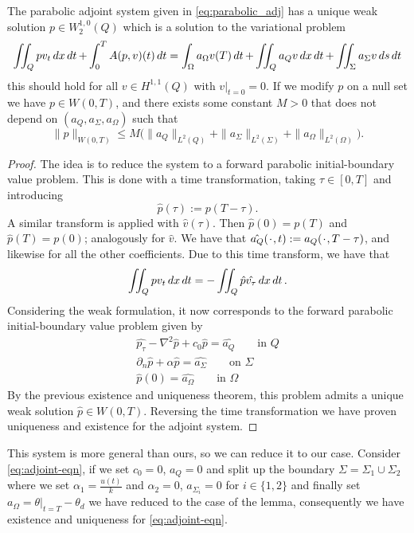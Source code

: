 \begin{lemma}
The parabolic adjoint system given in \eqref{eq:parabolic_adj} has a unique weak solution $p \in W_2^{1,0}(Q)$ which is a solution to the variational problem 
\begin{equation*}
    \iint_Q pv_t \mathop{dx}\mathop{dt} + \int_0^TA(p,v)(t)\mathop{dt} = \int_{\Omega}a_{\Omega}v(T) \mathop{dt} + \iint_Q a_Qv \mathop{dx}\mathop{dt} + \iint_{\Sigma}a_{\Sigma}v \mathop{ds}\mathop{dt}
\end{equation*}
this should hold for all $v \in H^{1,1}(Q)$ with $v|_{t=0} = 0$. If we modify $p$ on a null set we have $p\in W(0,T)$, and there exists some constant $M>0$ that does not depend on $(a_Q,a_{\Sigma}, a_{\Omega})$ such that 
\begin{equation*}
    \|p\|_{W(0,T)} \leq M \bigg (\|a_Q\|_{L^2(Q)} + \|a_{\Sigma}\|_{L^2(\Sigma)} + \|a_{\Omega}\|_{L^2(\Omega)} \bigg ).
\end{equation*}
\end{lemma}

\begin{proof}
The idea is to reduce the system to a forward parabolic initial-boundary value problem. This is done with a time transformation, taking $\tau \in [0,T]$ and introducing
\begin{equation*}
    \hat{p}(\tau) := p(T-\tau).
\end{equation*}
A similar transform is applied with $\hat{v}(\tau)$. Then $\hat{p}(0) = p(T)$ and $\hat{p}(T) = p(0)$; analogously for $\hat{v}$. We have that $\hat{a_Q}(\placeholder,t):= a_Q(\placeholder,T-\tau)$, and likewise for all the other coefficients. Due to this time transform, we have that
\begin{equation*}
    \iint_Qpv_t \mathop{dx}\mathop{dt} = - \iint_Q \hat{p}\hat{v_{\tau}} \mathop{dx}\mathop{dt}.
\end{equation*}
Considering the weak formulation, it now corresponds to the forward parabolic initial-boundary value problem given by 
\begin{align*}
    \hat{p_{\tau}} - \nabla^2 \hat{p} + c_0 \hat{p} = \hat{a_Q} \qquad \text{in } Q \\
    \partial_n \hat{p} + \alpha \hat{p} = \hat{a_{\Sigma}} \qquad \text{on } \Sigma \\
    \hat{p}(0) = \hat{a_{\Omega}} \qquad \text{in } \Omega
\end{align*}
By the previous existence and uniqueness theorem, this problem admits a unique weak solution $\hat{p} \in W(0,T)$. Reversing the time transformation we have proven uniqueness and existence for the adjoint system.
\end{proof}
This system is more general than ours, so we can reduce it to our case. Consider \eqref{eq:adjoint-eqn}, if we set $c_0 = 0$, $a_Q = 0$ and split up the boundary $\Sigma = \Sigma_1 \cup \Sigma_2$ where we set $\alpha_1 = \frac{u(t)}{k}$ and $\alpha_2 = 0$, $a_{\Sigma_i}=0$ for $i\in \{1,2 \}$ and finally set $a_{\Omega} = \theta|_{t=T}-\theta_d$ we have reduced to the case of the lemma, consequently we have existence and uniqueness for \eqref{eq:adjoint-eqn}.



